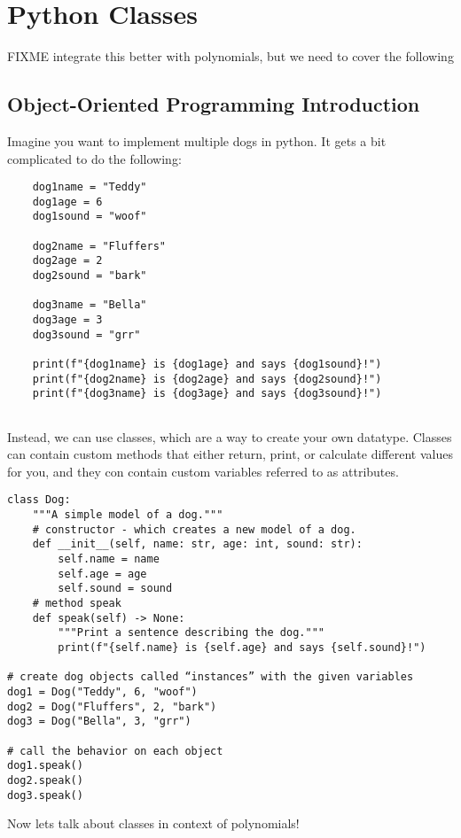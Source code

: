 \chapter{Python Classes}
FIXME integrate this better with polynomials, but we need to cover the following
\section{Object-Oriented Programming Introduction}
Imagine you want to implement multiple dogs in python. It gets a bit complicated to do the following:

\begin{verbatim}
    dog1name = "Teddy"
    dog1age = 6
    dog1sound = "woof"

    dog2name = "Fluffers"
    dog2age = 2
    dog2sound = "bark"

    dog3name = "Bella"
    dog3age = 3
    dog3sound = "grr"

    print(f"{dog1name} is {dog1age} and says {dog1sound}!")
    print(f"{dog2name} is {dog2age} and says {dog2sound}!")
    print(f"{dog3name} is {dog3age} and says {dog3sound}!")
    

\end{verbatim}

Instead, we can use classes, which are a way to create your own datatype.
Classes can contain custom methods that either return, print, or calculate different values for you, 
and they con contain custom variables referred to as attributes.

\begin{verbatim}
class Dog:
    """A simple model of a dog."""
    # constructor - which creates a new model of a dog. 
    def __init__(self, name: str, age: int, sound: str):
        self.name = name
        self.age = age
        self.sound = sound
    # method speak 
    def speak(self) -> None:
        """Print a sentence describing the dog."""
        print(f"{self.name} is {self.age} and says {self.sound}!")

# create dog objects called “instances” with the given variables
dog1 = Dog("Teddy", 6, "woof")
dog2 = Dog("Fluffers", 2, "bark")
dog3 = Dog("Bella", 3, "grr")

# call the behavior on each object
dog1.speak()
dog2.speak()
dog3.speak()

\end{verbatim}

Now lets talk about classes in context of polynomials!

